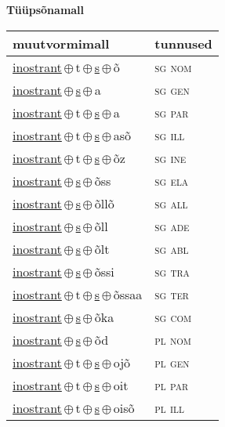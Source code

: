 

\vspace{3.5em}
\noindent \begin{minipage}{\textwidth}
\noindent \textbf{Tüüpsõnamall \,}\\

\begin{sideways}
\begin{tabular}{l l}
muutvormimall & tunnused \\
\hline
\underline{inostrant}\,$\oplus$\,t\,$\oplus$\,\underline{s}\,$\oplus$\,õ & \textsc{ sg nom } \\
\underline{inostrant}\,$\oplus$\,\underline{s}\,$\oplus$\,a & \textsc{ sg gen } \\
\underline{inostrant}\,$\oplus$\,t\,$\oplus$\,\underline{s}\,$\oplus$\,a & \textsc{ sg par } \\
\underline{inostrant}\,$\oplus$\,t\,$\oplus$\,\underline{s}\,$\oplus$\,asõ & \textsc{ sg ill } \\
\underline{inostrant}\,$\oplus$\,t\,$\oplus$\,\underline{s}\,$\oplus$\,õz & \textsc{ sg ine } \\
\underline{inostrant}\,$\oplus$\,\underline{s}\,$\oplus$\,õss & \textsc{ sg ela } \\
\underline{inostrant}\,$\oplus$\,\underline{s}\,$\oplus$\,õllõ & \textsc{ sg all } \\
\underline{inostrant}\,$\oplus$\,\underline{s}\,$\oplus$\,õll & \textsc{ sg ade } \\
\underline{inostrant}\,$\oplus$\,\underline{s}\,$\oplus$\,õlt & \textsc{ sg abl } \\
\underline{inostrant}\,$\oplus$\,\underline{s}\,$\oplus$\,õssi & \textsc{ sg tra } \\
\underline{inostrant}\,$\oplus$\,t\,$\oplus$\,\underline{s}\,$\oplus$\,õssaa & \textsc{ sg ter } \\
\underline{inostrant}\,$\oplus$\,\underline{s}\,$\oplus$\,õka & \textsc{ sg com } \\
\underline{inostrant}\,$\oplus$\,\underline{s}\,$\oplus$\,õd & \textsc{ pl nom } \\
\underline{inostrant}\,$\oplus$\,t\,$\oplus$\,\underline{s}\,$\oplus$\,ojõ & \textsc{ pl gen } \\
\underline{inostrant}\,$\oplus$\,t\,$\oplus$\,\underline{s}\,$\oplus$\,oit & \textsc{ pl par } \\
\underline{inostrant}\,$\oplus$\,t\,$\oplus$\,\underline{s}\,$\oplus$\,oisõ & \textsc{ pl ill } \\

\end{tabular}
\end{sideways}
\end{minipage}
